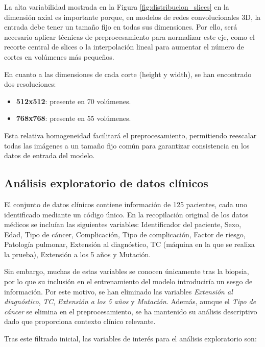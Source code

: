 La alta variabilidad mostrada en la Figura \ref{fig:distribucion_slices} en la dimensión axial es importante porque, en modelos de redes convolucionales 3D, la entrada debe tener un tamaño fijo en todas sus dimensiones. Por ello, será necesario aplicar técnicas de preprocesamiento para normalizar este eje, como el recorte central de slices o la interpolación lineal para aumentar el número de cortes en volúmenes más pequeños.


En cuanto a las dimensiones de cada corte (height y width), se han encontrado dos resoluciones:

\begin{itemize}
    \item \textbf{512x512}: presente en 70 volúmenes.
    \item \textbf{768x768}: presente en 55 volúmenes.
\end{itemize}

Esta relativa homogeneidad facilitará el preprocesamiento, permitiendo reescalar todas las imágenes a un tamaño fijo común para garantizar consistencia en los datos de entrada del modelo.


\subsection{Análisis exploratorio de datos clínicos}
El conjunto de datos clínicos contiene información de 125 pacientes, cada uno identificado mediante un código único. En la recopilación original de los datos médicos se incluían las siguientes variables: Identificador del paciente, Sexo, Edad, Tipo de cáncer, Complicación, Tipo de complicación, Factor de riesgo, Patología pulmonar, Extensión al diagnóstico, TC (máquina en la que se realiza la prueba), Extensión a los 5 años y Mutación.

Sin embargo, muchas de estas variables se conocen únicamente tras la biopsia, por lo que su inclusión en el entrenamiento del modelo introduciría un sesgo de información. Por este motivo, se han eliminado las variables \textit{Extensión al diagnóstico}, \textit{TC}, \textit{Extensión a los 5 años} y \textit{Mutación}. Además, aunque el \textit{Tipo de cáncer} se elimina en el preprocesamiento, se ha mantenido su análisis descriptivo dado que proporciona contexto clínico relevante.

Tras este filtrado inicial, las variables de interés para el análisis exploratorio son:

